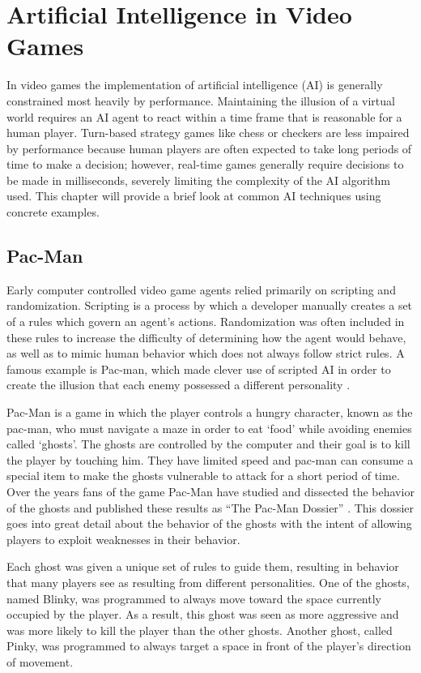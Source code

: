 \chapter{Artificial Intelligence in Video Games}
\label{chap:games}

In video games the implementation of artificial intelligence (AI) is generally constrained most heavily by performance. Maintaining the illusion of a virtual world requires an AI agent to react within a time frame that is reasonable for a human player. Turn-based strategy games like chess or checkers are less impaired by performance because human players are often expected to take long periods of time to make a decision; however, real-time games generally require decisions to be made in milliseconds, severely limiting the complexity of the AI algorithm used. This chapter will provide a brief look at common AI techniques using concrete examples.

\section{Pac-Man}

Early computer controlled video game agents relied primarily on scripting and randomization. Scripting is a process by which a developer manually creates a set of a rules which govern an agent's actions. Randomization was often included in these rules to increase the difficulty of determining how the agent would behave, as well as to mimic human behavior which does not always follow strict rules. A famous example is Pac-man, which made clever use of scripted AI in order to create the illusion that each enemy possessed a different personality \cite{pacman}.

Pac-Man is a game in which the player controls a hungry character, known as the pac-man, who must navigate a maze in order to eat `food' while avoiding enemies called `ghosts'. The ghosts are controlled by the computer and their goal is to kill the player by touching him. They have limited speed and pac-man can consume a special item to make the ghosts vulnerable to attack for a short period of time. Over the years fans of the game Pac-Man have studied and dissected the behavior of the ghosts and published these results as ``The Pac-Man Dossier'' \cite{pacman}. This dossier goes into great detail about the behavior of the ghosts with the intent of allowing players to exploit weaknesses in their behavior.

Each ghost was given a unique set of rules to guide them, resulting in behavior that many players see as resulting from different personalities. One of the ghosts, named Blinky, was programmed to always move toward the space currently occupied by the player. As a result, this ghost was seen as more aggressive and was more likely to kill the player than the other ghosts. Another ghost, called Pinky, was programmed to always target a space in front of the player's direction of movement.


